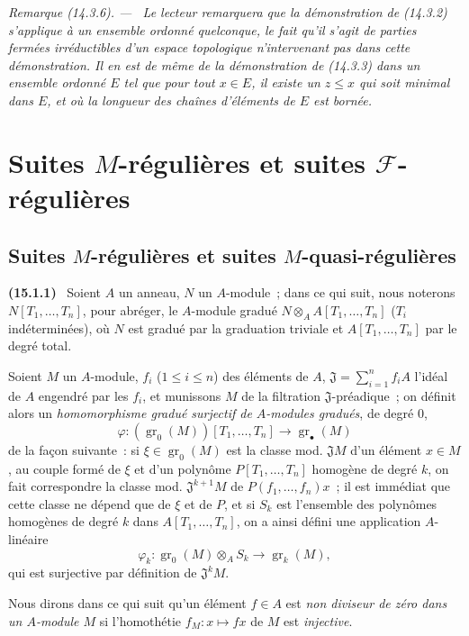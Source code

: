 \documentclass[10pt,oneside]{book}
\makeatletter
\newcommand{\gr}{\operatorname{gr}}
\newcommand{\setmanualcurrentlabel}[1]{\def\@currentlabel{#1}}
\newcommand{\oldpage}[2][]{%
  \setcounter{footnote}{0}%
  \marginpar{\scriptsize\textbf{#1}~|~#2}\ignorespaces}
\newenvironment{env}[1][]{\setmanualcurrentlabel{#1}\par\medskip\noindent\textbf{(#1)}\ }{\par}
\newenvironment{remark}[1][]{%
  \setmanualcurrentlabel{#1}\par\medskip\noindent\itshape Remarque (#1). ---\ }{\par}
\makeatother
\begin{document}
\begin{remark}[14.3.6]
\label{0.14.3.6-fr}
Le lecteur remarquera que la démonstration de (14.3.2) s'applique à un
ensemble ordonné quelconque, le fait qu'il s'agit de parties fermées
irréductibles d'un espace topologique n'intervenant pas dans cette
démonstration. Il en est de même de la démonstration de (14.3.3) dans un
ensemble ordonné $E$ tel que pour tout $x\in E$, il existe un $z\leq x$ qui
soit \emph{minimal} dans $E$, et où la longueur des chaînes d'éléments de $E$
est bornée.
\end{remark}


%
\section{Suites \texorpdfstring{$M$}{M}-régulières et suites
\texorpdfstring{$\mathscr F$}{F}-régulières}
\label{section:0.15-fr}

\subsection{Suites \texorpdfstring{$M$}{M}-régulières et suites
\texorpdfstring{$M$}{M}-quasi-régulières}
\label{subsection:0.15.1-fr}
\label{0.15.1-fr}

\begin{env}[15.1.1]
\label{0.15.1.1-fr}
\oldpage[0\textsubscript{IV-1}]{12}
Soient $A$ un anneau, $N$ un $A$-module~; dans ce qui suit, nous noterons
$N[T_1,\ldots,T_n]$, pour abréger, le $A$-module gradué
$N\otimes_A A[T_1,\ldots,T_n]$ ($T_i$ indéterminées), où $N$ est gradué par la
graduation triviale et $A[T_1,\ldots,T_n]$ par le degré total.

Soient $M$ un $A$-module, $f_i$ ($1\leq i\leq n$) des éléments de $A$,
$\mathfrak{J}=\sum_{i=1}^n f_iA$ l'idéal de $A$ engendré par les $f_i$, et
munissons $M$ de la filtration $\mathfrak{J}$-préadique~; on définit alors un
\emph{homomorphisme gradué surjectif de $A$-modules gradués}, de degré $0$,
\[
  \varphi : (\gr_0(M))[T_1,\ldots,T_n]\longrightarrow\gr_\bullet(M)
  \tag{15.1.1.1}\label{0.15.1.1.1-fr}
\]
de la façon suivante~: si $\xi\in\gr_0(M)$ est la classe mod.
$\mathfrak{J}M$ d'un élément $x\in M$, au couple formé de $\xi$ et d'un
polynôme $P[T_1,\ldots,T_n]$ homogène de degré $k$, on fait correspondre la
classe mod. $\mathfrak{J}^{k+1}M$ de $P(f_1,\ldots,f_n)x$~; il est immédiat
que cette classe
\oldpage[0\textsubscript{IV-1}]{13}
ne dépend que de $\xi$ et de $P$, et si $S_k$ est l'ensemble des polynômes
homogènes de degré $k$ dans $A[T_1,\ldots,T_n]$, on a ainsi défini une
application $A$-linéaire
\[
  \varphi_k:\gr_0(M)\otimes_A S_k\longrightarrow\gr_k(M),
\]
qui est surjective par définition de $\mathfrak{J}^kM$.

Nous dirons dans ce qui suit qu'un élément $f\in A$ est \emph{non diviseur de
zéro dans un $A$-module $M$} si l'homothétie $f_M:x\mapsto fx$ de $M$ est
\emph{injective}.
\end{env}
\end{document}
